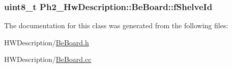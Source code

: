 \hypertarget{class_ph2___hw_description_1_1_be_board_a8e45d863c0a596466a78fd3e16ef92d1}{
\subsubsection[{f\-Shelve\-Id}]{\setlength{\rightskip}{0pt plus 5cm}uint8\-\_\-t Ph2\-\_\-\-Hw\-Description\-::\-Be\-Board\-::f\-Shelve\-Id}}\label{class_ph2___hw_description_1_1_be_board_a8e45d863c0a596466a78fd3e16ef92d1}


The documentation for this class was generated from the following files\-:\begin{DoxyCompactItemize}
\item 
H\-W\-Description/\hyperlink{_be_board_8h}{Be\-Board.\-h}\item 
H\-W\-Description/\hyperlink{_be_board_8cc}{Be\-Board.\-cc}\end{DoxyCompactItemize}
